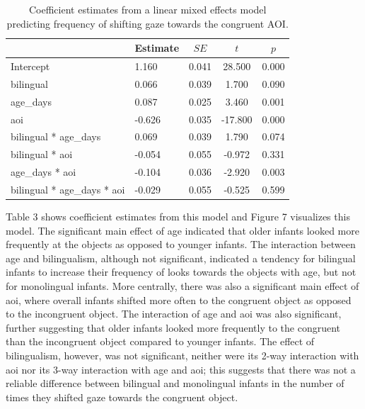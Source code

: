 \documentclass[,man,floatsintext]{apa6}
\begin{document}
\begin{table}[tbp]
\begin{center}
\begin{threeparttable}
\caption{\label{tab:coef_table_frequency}Coefficient estimates from a linear mixed effects model predicting frequency of shifting gaze towards the congruent AOI.}
\begin{tabular}{llccc}
\toprule
 & Estimate & $SE$ & $t$ & $p$\\
\midrule
Intercept & 1.160 & 0.041 & 28.500 & 0.000\\
bilingual & 0.066 & 0.039 & 1.700 & 0.090\\
age\_days & 0.087 & 0.025 & 3.460 & 0.001\\
aoi & -0.626 & 0.035 & -17.800 & 0.000\\
bilingual * age\_days & 0.069 & 0.039 & 1.790 & 0.074\\
bilingual * aoi & -0.054 & 0.055 & -0.972 & 0.331\\
age\_days * aoi & -0.104 & 0.036 & -2.920 & 0.003\\
bilingual * age\_days * aoi & -0.029 & 0.055 & -0.525 & 0.599\\
\bottomrule
\end{tabular}
\end{threeparttable}
\end{center}
\end{table}

\noindent Table 3 shows coefficient estimates from this model and Figure 7 visualizes this model. The significant main effect of age indicated that older infants looked more frequently at the objects as opposed to younger infants. The interaction between age and bilingualism, although not significant, indicated a tendency for bilingual infants to increase their frequency of looks towards the objects with age, but not for monolingual infants. More centrally, there was also a significant main effect of aoi, where overall infants shifted more often to the congruent object as opposed to the incongruent object. The interaction of age and aoi was also significant, further suggesting that older infants looked more frequently to the congruent than the incongruent object compared to younger infants. The effect of bilingualism, however, was not significant, neither were its 2-way interaction with aoi nor its 3-way interaction with age and aoi; this suggests that there was not a reliable difference between bilingual and monolingual infants in the number of times they shifted gaze towards the congruent object.
\end{document}
